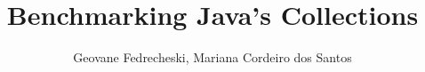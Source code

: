 \title{Benchmarking Java's Collections}
\author{Geovane Fedrecheski, Mariana Cordeiro dos Santos}

\address{Departamento de Ciência da Computação \\
Universidade Estadual do Centro-Oeste (UNICENTRO)\\
Rua Padre Salvador, 875 -- CEP 85015-430\\
Guarapuava -- PR -- Brasil -- Phone: (42) 3621-1000\\
}


